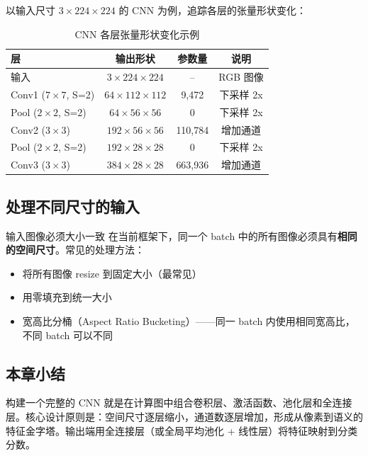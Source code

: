 \documentclass[a4paper]{article}
\begin{document}
以输入尺寸 $3 \times 224 \times 224$ 的 CNN 为例，追踪各层的张量形状变化：

\begin{table}[H]
\centering
\small
\begin{tabular}{lccc}
\toprule
\textbf{层} & \textbf{输出形状} & \textbf{参数量} & \textbf{说明} \\
\midrule
输入 & $3 \times 224 \times 224$ & -- & RGB 图像 \\
Conv1 ($7 \times 7$, S=2) & $64 \times 112 \times 112$ & 9,472 & 下采样 2x \\
Pool ($2 \times 2$, S=2) & $64 \times 56 \times 56$ & 0 & 下采样 2x \\
Conv2 ($3 \times 3$) & $192 \times 56 \times 56$ & 110,784 & 增加通道 \\
Pool ($2 \times 2$, S=2) & $192 \times 28 \times 28$ & 0 & 下采样 2x \\
Conv3 ($3 \times 3$) & $384 \times 28 \times 28$ & 663,936 & 增加通道 \\
\bottomrule
\end{tabular}
\caption{CNN 各层张量形状变化示例}
\end{table}

\subsection{处理不同尺寸的输入}

\begin{warningbox}{输入图像必须大小一致}
在当前框架下，同一个 batch 中的所有图像必须具有\textbf{相同的空间尺寸}。常见的处理方法：
\begin{itemize}
    \item 将所有图像 resize 到固定大小（最常见）
    \item 用零填充到统一大小
    \item 宽高比分桶（Aspect Ratio Bucketing）——同一 batch 内使用相同宽高比，不同 batch 可以不同
\end{itemize}
\end{warningbox}

\subsection{本章小结}

构建一个完整的 CNN 就是在计算图中组合卷积层、激活函数、池化层和全连接层。核心设计原则是：空间尺寸逐层缩小，通道数逐层增加，形成从像素到语义的特征金字塔。输出端用全连接层（或全局平均池化 + 线性层）将特征映射到分类分数。
\end{document}
